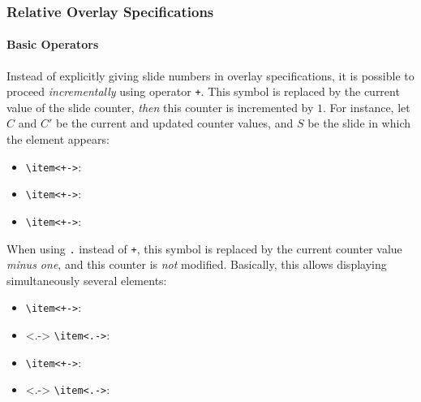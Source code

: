 \documentclass[10pt,    %
    english,            %
    xcolor=table,       %
    envcountsect,       %
    aspectratio=43      %
]{beamer}
\begin{document}
\begin{frame}
    \frametitle{Relative Overlay Specifications}
    \framesubtitle{Basic Operators}
    
    Instead of explicitly giving slide numbers in overlay specifications, it is possible to proceed \textit{incrementally} using operator \texttt{+}. This symbol is replaced by the current value of the slide counter, \textit{then} this counter is incremented by $1$. For instance, let $C$ and $C'$ be the current and updated counter values, and $S$ be the slide in which the element appears:
    {\vspace{-0.10cm}\small\begin{itemize}
        \item<+-> \texttt{\textbackslash{}item<+->}:   
        \item<+-> \texttt{\textbackslash{}item<+->}:   
        \item<+-> \texttt{\textbackslash{}item<+->}:   
    \end{itemize}}
    
    \smallskip
    When using \texttt{.} instead of \texttt{+}, this symbol is replaced by the current counter value \textit{minus one}, and this counter is \textit{not} modified. Basically, this allows displaying simultaneously several elements:
    {\vspace{-0.10cm}\small\begin{itemize}
        \item<+-> \texttt{\textbackslash{}item<+->}:   
        \item<.-> \texttt{\textbackslash{}item<.->}:   
        \item<+-> \texttt{\textbackslash{}item<+->}:   
        \item<.-> \texttt{\textbackslash{}item<.->}:   
    \end{itemize}}
\end{frame}
\end{document}

